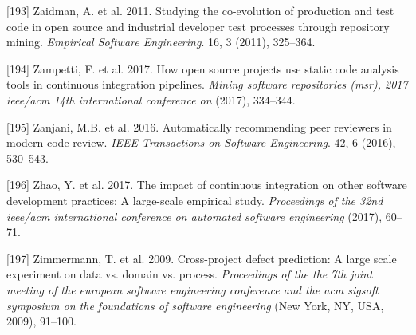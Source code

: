 \documentclass[]{book}
\begin{document}
\hypertarget{ref-zaidman2011studying}{}
{[}193{]} Zaidman, A. et al. 2011. Studying the co-evolution of
production and test code in open source and industrial developer test
processes through repository mining. \emph{Empirical Software
Engineering}. 16, 3 (2011), 325--364.

\hypertarget{ref-zampetti2017open}{}
{[}194{]} Zampetti, F. et al. 2017. How open source projects use static
code analysis tools in continuous integration pipelines. \emph{Mining
software repositories (msr), 2017 ieee/acm 14th international conference
on} (2017), 334--344.

\hypertarget{ref-zanjani2016automatically}{}
{[}195{]} Zanjani, M.B. et al. 2016. Automatically recommending peer
reviewers in modern code review. \emph{IEEE Transactions on Software
Engineering}. 42, 6 (2016), 530--543.

\hypertarget{ref-zhao2017impact}{}
{[}196{]} Zhao, Y. et al. 2017. The impact of continuous integration on
other software development practices: A large-scale empirical study.
\emph{Proceedings of the 32nd ieee/acm international conference on
automated software engineering} (2017), 60--71.

\hypertarget{ref-zimmermann2009}{}
{[}197{]} Zimmermann, T. et al. 2009. Cross-project defect prediction: A
large scale experiment on data vs. domain vs. process. \emph{Proceedings
of the the 7th joint meeting of the european software engineering
conference and the acm sigsoft symposium on the foundations of software
engineering} (New York, NY, USA, 2009), 91--100.
\end{document}
